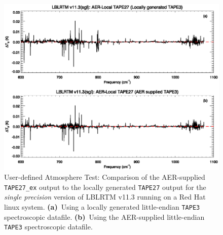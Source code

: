 \begin{figure}[htp]
  \includegraphics[bb=85 226 534 381,clip,scale=1.0]{graphics/run_example_user_defined_upwelling/sgl.eps}
  \caption{User-defined Atmosphere Test: Comparison of the AER-supplied \texttt{TAPE27\_ex} output to the locally generated \texttt{TAPE27} output for the \textsl{single precision} version of LBLRTM v11.3 running on a Red Hat linux system. \mbox{\textbf{(a)} Using} a locally generated little-endian \texttt{TAPE3} spectroscopic datafile. \mbox{\textbf{(b)} Using} the AER-supplied little-endian \texttt{TAPE3} spectroscopic datafile.}
  \label{fig:run_example_user_defined_upwelling-sgl}
\end{figure}

